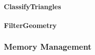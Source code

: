 \paragraph{ClassifyTriangles}

\paragraph{FilterGeometry}



\begin{comment}
\begin{figure}[htp] 
    \centering
    \fbox{\texttt{[image: figKDTreeSubdivideSpatialMid.pdf]}} 
    \renewcommand{\thefigure}{\thechapter.\arabic{figure}}
    \caption[The scene with the spatial median subdivision]{\emph{ The scene with the spatial median subdivision}}
    \label{fig:kd-tree_construction_parallel_pattern}
\end{figure}
\end{comment}

\subsubsection{Memory Management}






